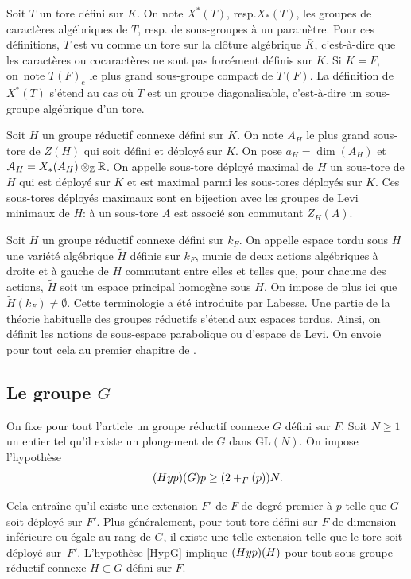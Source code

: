 \documentclass[11pt]{article}
\newcommand{\resp}{resp.\xspace}
\numberwithin{equation}{section}\providecommand{\og}{«\,}\providecommand{\fg}{\,»}
\let\mathcal \EuScript
\newcommand{\NoChangel}[1]{%
\expandafter\let\csname old\string#1\endcsname=#1
\let#1=\relax
\newcommand{#1}{\mathcode`l="716C\csname old\string#1\endcsname\mathcode`l="7160 }%
}
\newcommand{\rc}{\mathrm{c}}
\newcommand{\Hyp}{\textup{Hyp}}
\DeclareMathOperator{\val}{val} \NoChangel{\val}
\newcommand{\cA}{\mathcal{A}}
\newcommand{\ZZ}{\mathbb{Z}}
\newcommand{\RR}{\mathbb{R}}
\theoremstyle{plain}
\theoremstyle{definition}
\begin{document}
Soit $T$ un tore défini sur $K$. On note $X^{*}(T)$, \resp $X_{*}(T)$, les groupes de caractères algébriques de $T$, \resp de sous-groupes à un paramètre. Pour ces définitions, $T$ est vu comme un tore sur la clôture algébrique $\bar{K}$, c'est-à-dire que les caractères ou cocaractères ne sont pas forcément définis sur $K$. Si $K=F$, on~note $T(F)_{\rc}$ le plus grand sous-groupe compact de $T(F)$. La définition de $X^*(T)$ s'étend au cas où $T$ est un groupe diagonalisable, c'est-à-dire un sous-groupe algébrique d'un tore.

Soit $H$ un groupe réductif connexe défini sur $K$. On note $A_{H}$ le plus grand sous-tore de $Z(H)$ qui soit défini et déployé sur $K$. On pose $a_{H}=\dim(A_{H})$ et $\cA_{H}=X_{*}(A_{H})\otimes_{\ZZ}\RR$. On appelle sous-tore déployé maximal de $H$ un sous-tore de $H$ qui est déployé sur $K$ et est maximal parmi les sous-tores déployés sur $K$. Ces sous-tores déployés maximaux sont en bijection avec les groupes de Levi minimaux de $H$: à un sous-tore $A$ est associé son commutant $Z_{H}(A)$.

Soit $H$ un groupe réductif connexe défini sur $k_{F}$. On appelle espace tordu sous $H$ une variété algébrique $\tilde{H}$ définie sur $k_{F}$, munie de deux actions algébriques à droite et à gauche de $H$ commutant entre elles et telles que, pour chacune des actions, $\tilde{H}$ soit un espace principal homogène sous $H$. On impose de plus ici que $\tilde{H}(k_{F})\neq\emptyset$. Cette terminologie a été introduite par Labesse. Une partie de la théorie habituelle des groupes réductifs s'étend aux espaces tordus. Ainsi, on définit les notions de sous-espace parabolique ou d'espace de Levi. On envoie pour tout cela au premier chapitre de \cite{MW}.

\subsection{Le groupe \texorpdfstring{$G$}{G}}\label{legroupeG}

On fixe pour tout l'article un groupe réductif connexe $G$ défini sur $F$. Soit $N\geq1$ un entier tel qu'il existe un plongement de $G$ dans $\mathrm{GL}(N)$.
On impose l'hypothèse
\begin{equation}\tag*{$\textup{(\Hyp)}(G)$}\label{HypG}
p\geq (2+\val_{F}(p))N.
\end{equation}

Cela
entraîne qu'il existe une extension $F'$ de $F$ de degré premier à $p$ telle que $G$ soit déployé sur $F'$. Plus généralement, pour tout tore défini sur $F$ de dimension inférieure ou égale au rang de $G$, il existe une telle extension telle que le tore soit déployé sur~$F'$. L'hypothèse \ref{HypG} implique $(\Hyp)(H)$ pour tout sous-groupe réductif connexe $H\subset G$ défini sur $F$.
\end{document}
